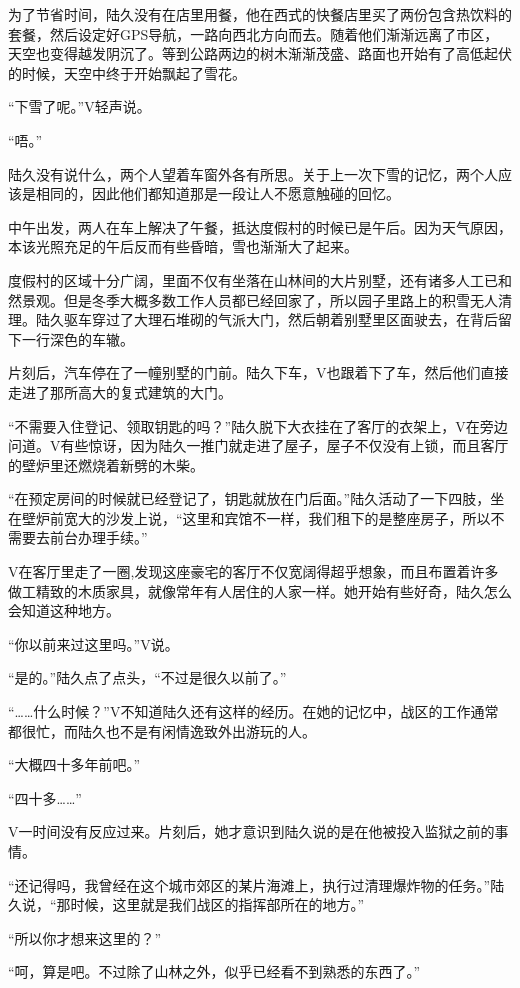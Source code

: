 为了节省时间，陆久没有在店里用餐，他在西式的快餐店里买了两份包含热饮料的套餐，然后设定好GPS导航，一路向西北方向而去。随着他们渐渐远离了市区，天空也变得越发阴沉了。等到公路两边的树木渐渐茂盛、路面也开始有了高低起伏的时候，天空中终于开始飘起了雪花。

“下雪了呢。”V轻声说。

“唔。”

陆久没有说什么，两个人望着车窗外各有所思。关于上一次下雪的记忆，两个人应该是相同的，因此他们都知道那是一段让人不愿意触碰的回忆。

中午出发，两人在车上解决了午餐，抵达度假村的时候已是午后。因为天气原因，本该光照充足的午后反而有些昏暗，雪也渐渐大了起来。

度假村的区域十分广阔，里面不仅有坐落在山林间的大片别墅，还有诸多人工已和然景观。但是冬季大概多数工作人员都已经回家了，所以园子里路上的积雪无人清理。陆久驱车穿过了大理石堆砌的气派大门，然后朝着别墅里区面驶去，在背后留下一行深色的车辙。

片刻后，汽车停在了一幢别墅的门前。陆久下车，V也跟着下了车，然后他们直接走进了那所高大的复式建筑的大门。

“不需要入住登记、领取钥匙的吗？”陆久脱下大衣挂在了客厅的衣架上，V在旁边问道。V有些惊讶，因为陆久一推门就走进了屋子，屋子不仅没有上锁，而且客厅的壁炉里还燃烧着新劈的木柴。

“在预定房间的时候就已经登记了，钥匙就放在门后面。”陆久活动了一下四肢，坐在壁炉前宽大的沙发上说，“这里和宾馆不一样，我们租下的是整座房子，所以不需要去前台办理手续。”

V在客厅里走了一圈,发现这座豪宅的客厅不仅宽阔得超乎想象，而且布置着许多做工精致的木质家具，就像常年有人居住的人家一样。她开始有些好奇，陆久怎么会知道这种地方。

“你以前来过这里吗。”V说。

“是的。”陆久点了点头，“不过是很久以前了。”

“……什么时候？”V不知道陆久还有这样的经历。在她的记忆中，战区的工作通常都很忙，而陆久也不是有闲情逸致外出游玩的人。

“大概四十多年前吧。”

“四十多……”

V一时间没有反应过来。片刻后，她才意识到陆久说的是在他被投入监狱之前的事情。

“还记得吗，我曾经在这个城市郊区的某片海滩上，执行过清理爆炸物的任务。”陆久说，“那时候，这里就是我们战区的指挥部所在的地方。”

“所以你才想来这里的？”

“呵，算是吧。不过除了山林之外，似乎已经看不到熟悉的东西了。”

